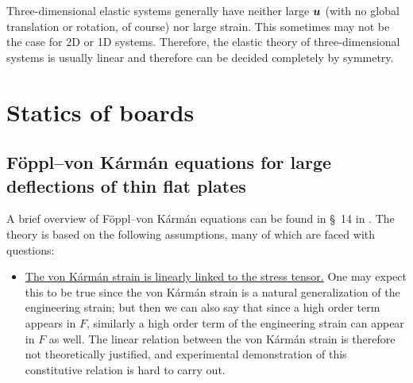 \documentclass[hyperref, a4paper]{article}
\newcommand*{\citesec}[1]{\S~{#1}}
\begin{document}
Three-dimensional elastic systems 
generally have neither large $\vb*{u}$ (with no global translation or rotation, of course)
nor large strain.
This sometimes may not be the case for 2D or 1D systems.
Therefore, the elastic theory of three-dimensional systems 
is usually linear and therefore can be decided completely by symmetry.


\section{Statics of boards}

\subsection{Föppl–von Kármán equations for  large deflections of thin flat plates}

A brief overview of Föppl–von Kármán equations can be found 
in \citesec{14} in \cite{landau1986theory}.
The theory is based on the following assumptions,
many of which are faced with questions:
\begin{itemize}
    \item \ul{The von Kármán strain is linearly linked to the stress tensor.}
    One may expect this to be true since 
    the von Kármán strain is a natural generalization 
    of the engineering strain;
    but then we can also say that 
    since a high order term appears in $F$,
    similarly a high order term of the engineering strain can appear in $F$ as well.
    The linear relation between the von Kármán strain 
    is therefore not theoretically justified,
    and experimental demonstration of this constitutive relation 
    is hard to carry out.
\end{itemize}

\printbibliography
\end{document}
